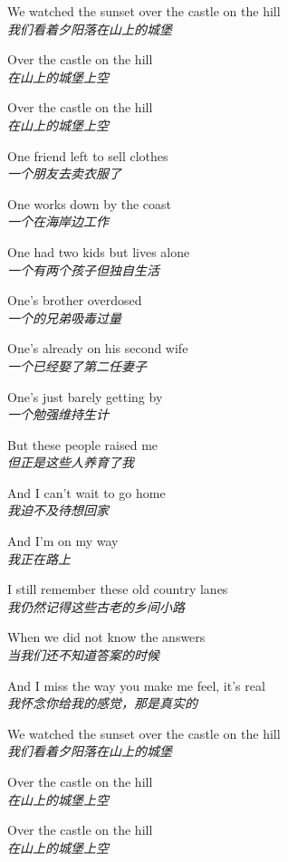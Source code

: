 \begin{spacing}{1.5}
\begin{flushleft}
We watched the sunset over the castle on the hill\\
\textit{我们看着夕阳落在山上的城堡}\lyricspace

Over the castle on the hill\\
\textit{在山上的城堡上空}\lyricspace

Over the castle on the hill\\
\textit{在山上的城堡上空}\lyricspace

One friend left to sell clothes\\
\textit{一个朋友去卖衣服了}\lyricspace

One works down by the coast\\
\textit{一个在海岸边工作}\lyricspace

One had two kids but lives alone\\
\textit{一个有两个孩子但独自生活}\lyricspace

One's brother overdosed\\
\textit{一个的兄弟吸毒过量}\lyricspace

One's already on his second wife\\
\textit{一个已经娶了第二任妻子}\lyricspace

One's just barely getting by\\
\textit{一个勉强维持生计}\lyricspace

But these people raised me\\
\textit{但正是这些人养育了我}\lyricspace

And I can't wait to go home\\
\textit{我迫不及待想回家}\lyricspace

And I'm on my way\\
\textit{我正在路上}\lyricspace

I still remember these old country lanes\\
\textit{我仍然记得这些古老的乡间小路}\lyricspace

When we did not know the answers\\
\textit{当我们还不知道答案的时候}\lyricspace

And I miss the way you make me feel, it's real\\
\textit{我怀念你给我的感觉，那是真实的}\lyricspace

We watched the sunset over the castle on the hill\\
\textit{我们看着夕阳落在山上的城堡}\lyricspace

Over the castle on the hill\\
\textit{在山上的城堡上空}\lyricspace

Over the castle on the hill\\
\textit{在山上的城堡上空}\lyricspace
\end{flushleft}
\end{spacing}
